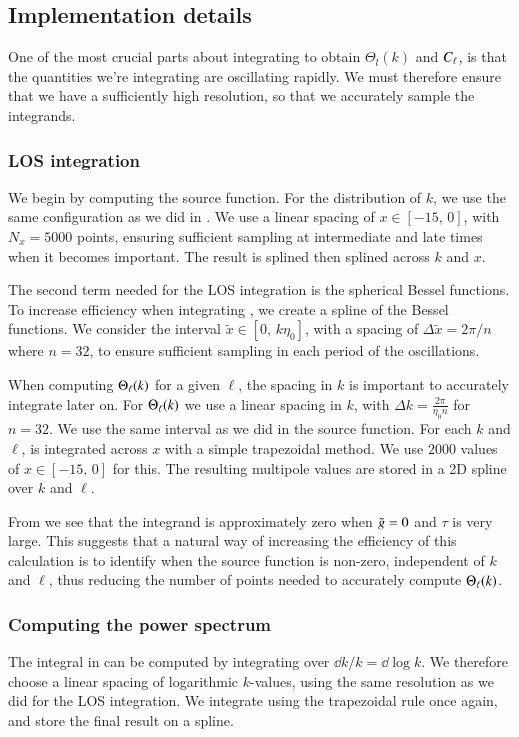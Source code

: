 \subsection{Implementation details}\label{ssec:M4:implementations} 
One of the most crucial parts about integrating to obtain $\Theta_l(k)$ and $C_\ell$, is that the quantities we're integrating are oscillating rapidly. We must therefore ensure that we have a sufficiently high resolution, so that we accurately sample the integrands. 

\subsubsection{LOS integration} \label{sssec:M4:implementations:LOS_integration}
We begin by computing the source function. For the distribution of $k$, we use the same configuration as we did in . We use a linear spacing of $x\in[-15,\,0]$, with $N_x=5000$ points, ensuring sufficient sampling at intermediate and late times when it becomes important. The result is splined then splined across $k$ and $x$.  

The second term needed for the LOS integration is the spherical Bessel functions. To increase efficiency when integrating , we create a spline of the Bessel functions. We consider the interval $\tilde{x}\in[0,\,k\eta_0]$, with a spacing of $\Delta\tilde{x}=2\pi/n$ where $n=32$, to ensure sufficient sampling in each period of the oscillations. 

When computing $\Theta_\ell(k)$ for a given $\ell$, the spacing in $k$ is important to accurately integrate  later on. For $\Theta_\ell(k)$ we use a linear spacing in $k$, with $\Delta k=\frac{2\pi}{\eta_0 n}$ for $n=32$. We use the same interval as we did in the source function. For each $k$ and $\ell$,  is integrated across $x$ with a simple trapezoidal method. We use $2000$ values of $x\in[-15,\,0]$ for this. The resulting multipole values are stored in a 2D spline over $k$ and $\ell$.  

From  we see that the integrand is approximately zero when $\tilde{g}=0$ and $\tau$ is very large. This suggests that a natural way of increasing the efficiency of this calculation is to identify when the source function is non-zero, independent of $k$ and $\ell$, thus reducing the number of points needed to accurately compute $\Theta_\ell(k)$.

\subsubsection{Computing the power spectrum} \label{sssec:M4:implementations:integrating_across_k}
The integral in  can be computed by integrating over $\dd k/k=\dd \log k$. We therefore choose a linear spacing of logarithmic $k$-values, using the same resolution as we did for the LOS integration. We integrate using the trapezoidal rule once again, and store the final result on a spline.   